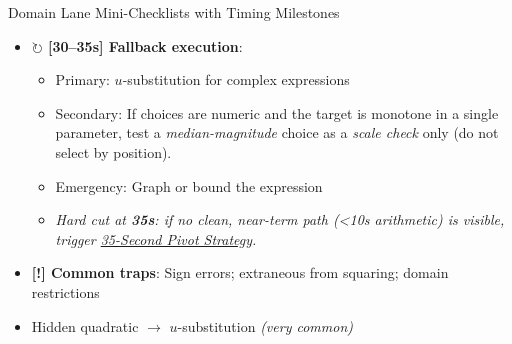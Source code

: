 \documentclass{article}
\newcommand{\timer}[1]{\textbf{\textcolor{timegreen}{#1}}}
\begin{document}
\begin{classifybox}{Domain Lane Mini-Checklists with Timing Milestones}
\begin{itemize}[nosep]
        \begin{itemize}[nosep]
        \item Bilinear $xy+ax+by=c \rightarrow (x+\alpha)(y+\beta)=\gamma$
        \item Check discriminant $b^2-4ac \geq 0$ for real solutions
        \item Quick test: Try $x \in \{0,1,-1,2\}$ before complex algebra
        \item Univariate integer polynomial? Try Rational Root Test and quick factor scan.
        \item Symmetric or nearly symmetric? Try $u = x+y$, $v = xy$ reduction.
        \end{itemize}
      \item \textbf{$\circlearrowright$ [30--35s] Fallback execution}:
        \begin{itemize}[nosep]
        \item Primary: $u$-substitution for complex expressions
        \item Secondary: If choices are numeric and the target is monotone in a single parameter, test a \emph{median-magnitude} choice as a \emph{scale check} only (do not select by position).
        \item Emergency: Graph or bound the expression
        \item \emph{Hard cut at \timer{35s}: if no clean, near-term path (<10s arithmetic) is visible, trigger \hyperlink{pivot35}{35-Second Pivot Strategy}.}
        \end{itemize}
      \item \textbf{[!] Common traps}: Sign errors; extraneous from squaring; domain restrictions
      \item {} Hidden quadratic $\rightarrow$ $u$-substitution \emph{(very common)}
      \end{itemize}
      
      \vspace{3mm}

\end{classifybox}
\end{document}
